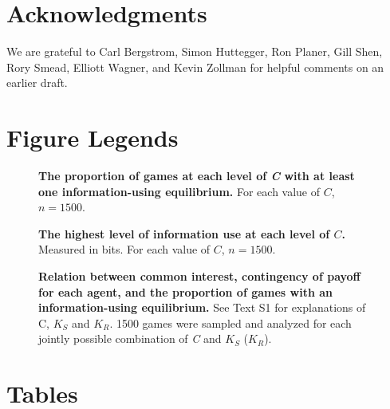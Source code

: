 \documentclass[10pt]{article}
\begin{document}
\section*{Acknowledgments}

We are grateful to Carl Bergstrom, Simon Huttegger, Ron Planer, Gill
Shen, Rory Smead, Elliott Wagner, and Kevin Zollman for helpful comments
on an earlier draft.



\pagebreak
\section*{Figure Legends}
\begin{figure}[!ht]
\begin{center}
\end{center}
\caption{
{\bf The proportion of games at each level of \emph{C} with
at least one information-using equilibrium.} For each value of $C$,
$n=1500$.}
\label{Figure_label}
\end{figure}

\begin{figure}[!ht]
\begin{center}
\end{center}
\caption{
{\bf The highest level of information use at each level of $C$.} Measured in bits. For each value of $C$, $n=1500$.}
\label{Figure_label}
\end{figure}

\begin{figure}[!ht]
\begin{center}
\end{center}
\caption{
    {\bf Relation between common interest,
contingency of payoff for each agent, and the proportion of games with
an information-using equilibrium.} See Text S1 for explanations of
C, $K_S$ and $K_R$. 1500 games were sampled and analyzed for each
jointly possible combination of \emph{C} and $K_S$ ($K_R$).}
\label{Figure_label}
\end{figure}
\pagebreak

\section*{Tables}
\end{document}
